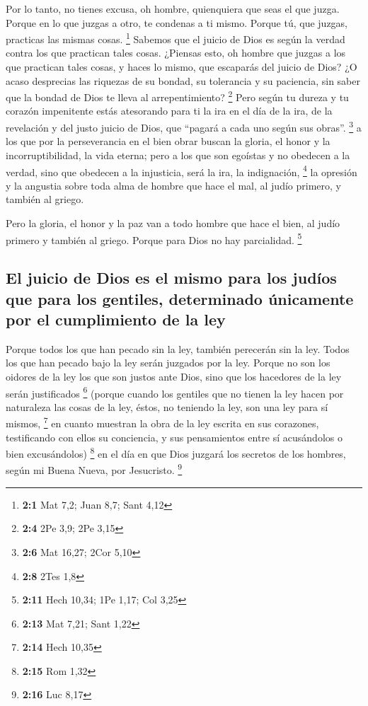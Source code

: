 \begin{paracol}{2}
 Por lo tanto, no tienes excusa, oh hombre, quienquiera
que seas el que juzga. Porque en lo que juzgas a otro, te condenas a ti
mismo. Porque tú, que juzgas, practicas las mismas cosas. \footnote{\textbf{2:1}
  Mat 7,2; Juan 8,7; Sant 4,12}  Sabemos que el juicio de
Dios es según la verdad contra los que practican tales cosas.
 ¿Piensas esto, oh hombre que juzgas a los que practican
tales cosas, y haces lo mismo, que escaparás del juicio de Dios?
 ¿O acaso desprecias las riquezas de su bondad, su
tolerancia y su paciencia, sin saber que la bondad de Dios te lleva al
arrepentimiento? \footnote{\textbf{2:4} 2Pe 3,9; 2Pe 3,15}
 Pero según tu dureza y tu corazón impenitente estás
atesorando para ti la ira en el día de la ira, de la revelación y del
justo juicio de Dios,  que ``pagará a cada uno según sus
obras''. \footnote{\textbf{2:6} Mat 16,27; 2Cor 5,10}  a
los que por la perseverancia en el bien obrar buscan la gloria, el honor
y la incorruptibilidad, la vida eterna;  pero a los que
son egoístas y no obedecen a la verdad, sino que obedecen a la
injusticia, será la ira, la indignación, \footnote{\textbf{2:8} 2Tes 1,8}
 la opresión y la angustia sobre toda alma de hombre que
hace el mal, al judío primero, y también al griego.

 Pero la gloria, el honor y la paz van a todo hombre que
hace el bien, al judío primero y también al griego. 
Porque para Dios no hay parcialidad. \footnote{\textbf{2:11} Hech 10,34;
  1Pe 1,17; Col 3,25}

\hypertarget{el-juicio-de-dios-es-el-mismo-para-los-juduxedos-que-para-los-gentiles-determinado-uxfanicamente-por-el-cumplimiento-de-la-ley}{%
\subsection{El juicio de Dios es el mismo para los judíos que para los
gentiles, determinado únicamente por el cumplimiento de la
ley}\label{el-juicio-de-dios-es-el-mismo-para-los-juduxedos-que-para-los-gentiles-determinado-uxfanicamente-por-el-cumplimiento-de-la-ley}}

 Porque todos los que han pecado sin la ley, también
perecerán sin la ley. Todos los que han pecado bajo la ley serán
juzgados por la ley.  Porque no son los oidores de la ley
los que son justos ante Dios, sino que los hacedores de la ley serán
justificados \footnote{\textbf{2:13} Mat 7,21; Sant 1,22}
 (porque cuando los gentiles que no tienen la ley hacen
por naturaleza las cosas de la ley, éstos, no teniendo la ley, son una
ley para sí mismos, \footnote{\textbf{2:14} Hech 10,35} 
en cuanto muestran la obra de la ley escrita en sus corazones,
testificando con ellos su conciencia, y sus pensamientos entre sí
acusándolos o bien excusándolos) \footnote{\textbf{2:15} Rom 1,32}
 en el día en que Dios juzgará los secretos de los
hombres, según mi Buena Nueva, por Jesucristo. \footnote{\textbf{2:16}
  Luc 8,17}


\end{paracol}
